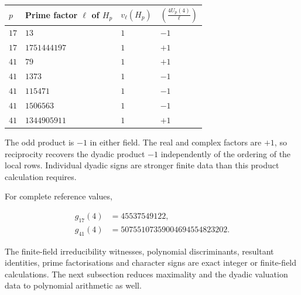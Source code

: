\documentclass[11pt,a4paper]{article}
\newcounter{none}
\begin{document}
{\def\LTcaptype{none} %
\begin{longtable}[]{@{}
  >{\centering\arraybackslash}p{}
  >{\centering\arraybackslash}p{}
  >{\centering\arraybackslash}p{}
  >{\centering\arraybackslash}p{}@{}}
\toprule\noalign{}
\begin{minipage}[b]{\linewidth}\centering
\(p\)
\end{minipage} & \begin{minipage}[b]{\linewidth}\centering
Prime factor \(\ell\) of \(H_p\)
\end{minipage} & \begin{minipage}[b]{\linewidth}\centering
\(v_\ell(H_p)\)
\end{minipage} & \begin{minipage}[b]{\linewidth}\centering
\(\left(\frac{4U_p(4)}{\ell}\right)\)
\end{minipage} \\
\midrule\noalign{}
\endhead
\bottomrule\noalign{}
\endlastfoot
\(17\) & \(13\) & \(1\) & \(-1\) \\
\(17\) & \(1751444197\) & \(1\) & \(+1\) \\
\(41\) & \(79\) & \(1\) & \(+1\) \\
\(41\) & \(1373\) & \(1\) & \(-1\) \\
\(41\) & \(115471\) & \(1\) & \(-1\) \\
\(41\) & \(1506563\) & \(1\) & \(-1\) \\
\(41\) & \(1344905911\) & \(1\) & \(+1\) \\
\end{longtable}
}

The odd product is \(-1\) in either field. The real and complex factors
are \(+1\), so reciprocity recovers the dyadic product \(-1\)
independently of the ordering of the local rows. Individual dyadic signs
are stronger finite data than this product calculation requires.

For complete reference values,

\[
\begin{aligned}
g_{17}(4)&=45537549122,\\
g_{41}(4)&=50755107359004694554823202.
\end{aligned}
\tag{A.1}
\]

The finite-field irreducibility witnesses, polynomial discriminants,
resultant identities, prime factorisations and character signs are exact
integer or finite-field calculations. The next subsection reduces
maximality and the dyadic valuation data to polynomial arithmetic as
well.
\end{document}
